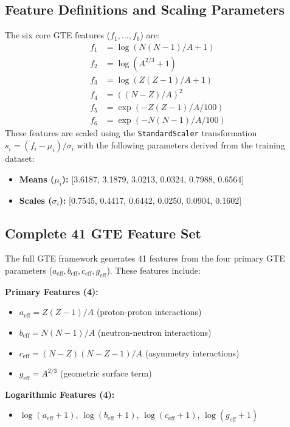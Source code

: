 \documentclass[9pt,twocolumn]{extarticle}
\newcommand{\eff}{\text{eff}}
\begin{document}
\subsection{Feature Definitions and Scaling Parameters}
The six core GTE features ($f_1, \dots, f_6$) are:
\begin{align*}
    f_1 &= \log(N(N-1)/A + 1) \\
    f_2 &= \log(A^{2/3} + 1) \\
    f_3 &= \log(Z(Z-1)/A + 1) \\
    f_4 &= ((N-Z)/A)^2 \\
    f_5 &= \exp(-Z(Z-1)/A/100) \\
    f_6 &= \exp(-N(N-1)/A/100)
\end{align*}
These features are scaled using the \texttt{StandardScaler} transformation $s_i = (f_i - \mu_i) / \sigma_i$ with the following parameters derived from the training dataset:
\begin{itemize}
    \item \textbf{Means ($\mu_i$):} [3.6187, 3.1879, 3.0213, 0.0324, 0.7988, 0.6564]
    \item \textbf{Scales ($\sigma_i$):} [0.7545, 0.4417, 0.6442, 0.0250, 0.0904, 0.1602]
\end{itemize}

\subsection{Complete 41 GTE Feature Set}
The full GTE framework generates 41 features from the four primary GTE parameters ($a_{\eff}, b_{\eff}, c_{\eff}, g_{\eff}$). These features include:

\textbf{Primary Features (4):}
\begin{itemize}
    \item $a_{\eff} = Z(Z-1)/A$ (proton-proton interactions)
    \item $b_{\eff} = N(N-1)/A$ (neutron-neutron interactions)
    \item $c_{\eff} = (N-Z)(N-Z-1)/A$ (asymmetry interactions)
    \item $g_{\eff} = A^{2/3}$ (geometric surface term)
\end{itemize}

\textbf{Logarithmic Features (4):}
\begin{itemize}
    \item $\log(a_{\eff} + 1)$, $\log(b_{\eff} + 1)$, $\log(c_{\eff} + 1)$, $\log(g_{\eff} + 1)$
\end{itemize}
\end{document}
